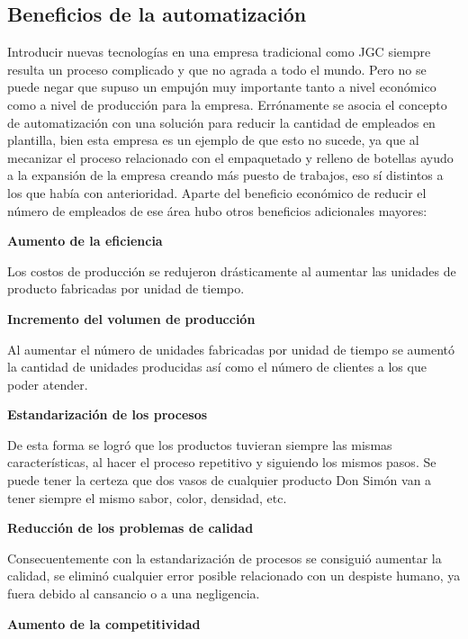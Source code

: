 \documentclass[11pt,a4paper,spanish,twoside]{report}
\begin{document}
\begin{description}
\chapter{Beneficios de la automatización}
Introducir nuevas tecnologías en una empresa tradicional como JGC siempre
resulta un proceso complicado y que no agrada a todo el mundo. Pero no se
puede negar que supuso un empujón muy importante tanto a nivel económico como
a nivel de producción para la empresa. Errónamente se asocia el concepto de
automatización con una solución para reducir la cantidad de empleados en
plantilla, bien esta empresa es un ejemplo de que esto no sucede, ya que al
mecanizar el proceso relacionado con el empaquetado y relleno de botellas
ayudo a la expansión de la empresa creando más puesto de trabajos, eso sí
distintos a los que había con anterioridad. Aparte del beneficio económico de
reducir el número de empleados de ese área hubo otros beneficios adicionales
mayores:

\begin{description}
\item \textbf{Aumento de la eficiencia}

Los costos de producción se redujeron drásticamente al aumentar las
unidades de producto fabricadas por unidad de tiempo. 

\item \textbf{Incremento del volumen de producción}

Al aumentar el número de unidades fabricadas por unidad de tiempo se aumentó
la cantidad de unidades producidas así como el número de clientes a los que
poder atender.

\item \textbf{Estandarización de los procesos}

De esta forma se logró que los productos tuvieran siempre las mismas
características, al hacer el proceso repetitivo y siguiendo los mismos
pasos. Se puede tener la certeza que dos vasos de cualquier producto Don
Simón van a tener siempre el mismo sabor, color, densidad, etc.

\item \textbf{Reducción de los problemas de calidad}

Consecuentemente con la estandarización de procesos se consiguió aumentar la
calidad, se eliminó cualquier error posible relacionado con un despiste
humano, ya fuera debido al cansancio o a una negligencia. 

\item \textbf{Aumento de la competitividad}


\end{description}
\end{description}
\end{document}
